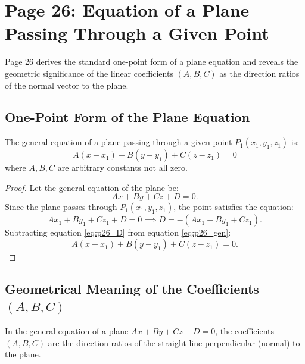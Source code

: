 \section{Page 26: Equation of a Plane Passing Through a Given Point}
\label{sec:page26}

\begin{conceptbox}
Page 26 derives the standard one-point form of a plane equation and reveals the geometric significance of the linear coefficients $(A, B, C)$ as the direction ratios of the normal vector to the plane.
\end{conceptbox}

\subsection{One-Point Form of the Plane Equation}
\begin{theorembox}
The general equation of a plane passing through a given point $P_1(x_1, y_1, z_1)$ is:
\begin{equation}
    \boxed{A(x - x_1) + B(y - y_1) + C(z - z_1) = 0}
\end{equation}
where $A, B, C$ are arbitrary constants not all zero.
\end{theorembox}

\begin{proof}
Let the general equation of the plane be:
\begin{equation}
    Ax + By + Cz + D = 0. \label{eq:p26_gen}
\end{equation}
Since the plane passes through $P_1(x_1, y_1, z_1)$, the point satisfies the equation:
\begin{equation}
    Ax_1 + By_1 + Cz_1 + D = 0 \implies D = -(Ax_1 + By_1 + Cz_1). \label{eq:p26_D}
\end{equation}
Subtracting equation \eqref{eq:p26_D} from equation \eqref{eq:p26_gen}:
\begin{equation}
    A(x - x_1) + B(y - y_1) + C(z - z_1) = 0.
\end{equation}
\end{proof}

\subsection{Geometrical Meaning of the Coefficients $(A, B, C)$}
\begin{theorembox}
In the general equation of a plane $Ax + By + Cz + D = 0$, the coefficients $(A, B, C)$ are the direction ratios of the straight line perpendicular (normal) to the plane.
\end{theorembox}

